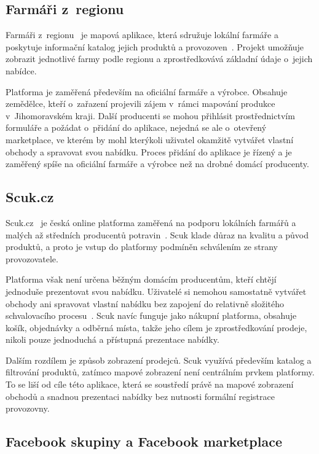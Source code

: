 \subsection[Farmáři z~regionu]{Farmáři z~regionu}
Farmáři z~regionu~\parencite{farmari_z_regionu_web} je mapová aplikace, která sdružuje lokální farmáře a poskytuje informační katalog jejich produktů a provozoven~\parencite{metropolitni_brno_farmari_2025}.
Projekt umožňuje zobrazit jednotlivé farmy podle regionu a zprostředkovává základní údaje o~jejich nabídce.

Platforma je zaměřená především na oficiální farmáře a výrobce.
Obsahuje zemědělce, kteří o~zařazení projevili zájem v~rámci mapování produkce v~Jihomoravském kraji.
Další producenti se mohou přihlásit prostřednictvím formuláře a požádat o~přidání do aplikace, nejedná se ale o~otevřený marketplace, ve kterém by mohl kterýkoli uživatel okamžitě vytvářet vlastní obchody a spravovat svou nabídku.
Proces přidání do aplikace je řízený a je zaměřený spíše na oficiální farmáře a výrobce než na drobné domácí producenty.

\subsection{Scuk.cz}
Scuk.cz~\parencite{scuk_web} je česká online platforma zaměřená na podporu lokálních farmářů a malých až středních producentů potravin~\parencite{scuk_napoveda_2025}.
Scuk klade důraz na kvalitu a původ produktů, a proto je vstup do platformy podmíněn schválením ze strany provozovatele.

Platforma však není určena běžným domácím producentům, kteří chtějí jednoduše prezentovat svou nabídku.
Uživatelé si nemohou samostatně vytvářet obchody ani spravovat vlastní nabídku bez zapojení do relativně složitého schvalovacího procesu~\parencite{scuk_kodex_2025}.
Scuk navíc funguje jako nákupní platforma, obsahuje košík, objednávky a odběrná místa, takže jeho cílem je zprostředkování prodeje, nikoli pouze jednoduchá a přístupná prezentace nabídky.

Dalším rozdílem je způsob zobrazení prodejců.
Scuk využívá především katalog a filtrování produktů, zatímco mapové zobrazení není centrálním prvkem platformy.
To se liší od cíle této aplikace, která se soustředí právě na mapové zobrazení obchodů a snadnou prezentaci nabídky bez nutnosti formální registrace provozovny.

\subsection{Facebook skupiny a Facebook marketplace}

